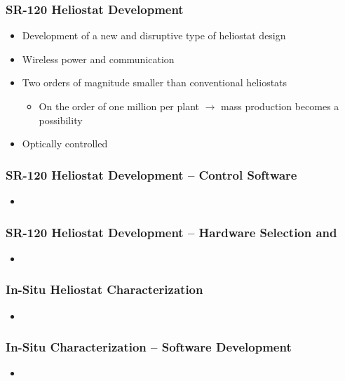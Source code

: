 \documentclass[aspectratio=169]{beamer}
\begin{document}
\begin{frame}
  \frametitle{SR-120 Heliostat Development}
  \begin{itemize}
  \item Development of a new and disruptive type of heliostat design
  \item Wireless power and communication
  \item Two orders of magnitude smaller than conventional heliostats
    \begin{itemize}
    \item On the order of one million per plant $\rightarrow$ mass
      production becomes a possibility
    \end{itemize}
    \item Optically controlled
  \end{itemize}
\end{frame}

\begin{frame}
  \frametitle{SR-120 Heliostat Development -- Control Software}
    \begin{itemize}
    \item
  \end{itemize}
\end{frame}

\begin{frame}
  \frametitle{SR-120 Heliostat Development -- Hardware Selection and }
    \begin{itemize}
    \item
  \end{itemize}
\end{frame}

\begin{frame}
  \frametitle{In-Situ Heliostat Characterization}
  \begin{itemize}
    \item
  \end{itemize}
\end{frame}

\begin{frame}
  \frametitle{In-Situ Characterization -- Software Development}
  \begin{itemize}
  \item
  \end{itemize}
\end{frame}
\end{document}
